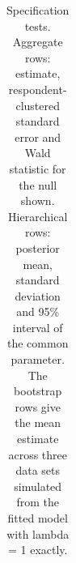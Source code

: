 \documentclass[
  letterpaper,
  DIV=11,
  numbers=noendperiod]{scrartcl}
\theoremstyle{plain}
\theoremstyle{plain}
\theoremstyle{plain}
\theoremstyle{remark}
\begin{document}
\begin{longtable}[]{@{}
  >{\raggedright\arraybackslash}p{}
  >{\raggedright\arraybackslash}p{}
  >{\raggedright\arraybackslash}p{}
  >{\raggedright\arraybackslash}p{}
  >{\raggedright\arraybackslash}p{}
  >{\raggedright\arraybackslash}p{}@{}}

\caption{\label{tbl-emp-spec}Specification tests. Aggregate rows:
estimate, respondent-clustered standard error and Wald statistic for the
null shown. Hierarchical rows: posterior mean, standard deviation and
95\% interval of the common parameter. The bootstrap rows give the mean
estimate across three data sets simulated from the fitted model with
lambda = 1 exactly.}

\tabularnewline


\end{longtable}
\end{document}
